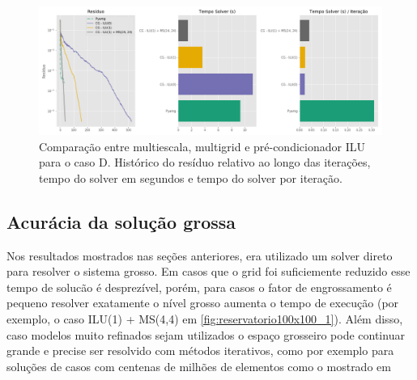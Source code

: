     
\begin{figure}[!htbp]
\label{fig:casoE_2}
\centering
\includegraphics[width=\textwidth]{chap08/figs/casoE_2.png}
\caption{Comparação entre multiescala, multigrid e pré-condicionador ILU para o caso D. Histórico do resíduo relativo ao longo das iterações, tempo do solver em segundos e tempo do solver por iteração. }
\end{figure}


\subsection{Acurácia da solução grossa}

Nos resultados mostrados nas seções anteriores, era utilizado um solver direto para resolver 
o sistema grosso. Em casos que o grid foi suficiemente reduzido esse tempo de solucão é desprezível,
porém, para casos o fator de engrossamento é pequeno resolver exatamente o nível grosso aumenta
o tempo de execução (por exemplo, o caso ILU(1) + MS(4,4) em \ref{fig:reservatorio100x100_1}). 
Além disso, caso modelos muito refinados sejam utilizados o espaço grosseiro pode continuar
grande e precise ser resolvido com métodos iterativos, como por exemplo para soluções de casos
com centenas de milhões de elementos como o mostrado em 